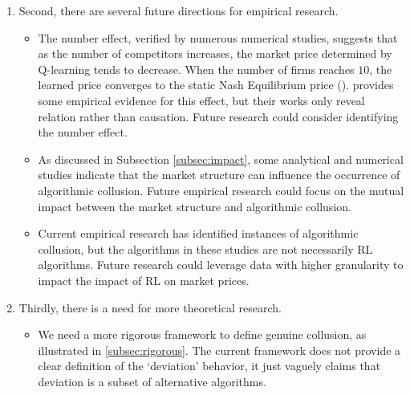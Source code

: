 \documentclass[mnsc,nonblindrev]{workingpaper}
\begin{document}
\begin{enumerate}
\begin{itemize}
            \item Another direction for numerical research is inspired by \cite{spann2024algorithmic}. Beyond algorithmic collusion, can AI pricing algorithms lead to unfair pricing and facilitate automatic price discrimination in other market environments? This is a question that deserves further exploration. 

            \item Furthur research could investigate whether AI algorithms would lead to algorithmic collusion in other disciplines, such as the financial markets (\cite{contDynamicsMarketMaking2024}, \cite{dou2024ai}), auction games (\cite{banchio2022artificial}, \cite{banchioartificial}), assortment optimization (\cite{aouad2021algorithmic}), airline revenue management (\cite{gu2023can}).
        \end{itemize}

    \item Second, there are several future directions for empirical research.
        \begin{itemize}
        \setlength{\itemsep}{0.7em}
            \item The number effect, verified by numerous numerical studies, suggests that as the number of competitors increases, the market price determined by Q-learning tends to decrease. When the number of firms reaches $10$, the learned price converges to the static Nash Equilibrium price (\cite{hettich2021algorithmic}). \cite{wieting2021algorithms} provides some empirical evidence for this effect, but their works only reveal relation rather than causation. Future research could consider identifying the number effect.
            \item As discussed in Subsection \ref{subsec:impact}, some analytical and numerical studies indicate that the market structure can influence the occurrence of algorithmic collusion. Future empirical research could focus on the mutual impact between the market structure and algorithmic collusion.
            \item Current empirical research has identified instances of algorithmic collusion, but the algorithms in these studies are not necessarily RL algorithms. Future research could leverage data with higher granularity to impact the impact of RL on market prices.
        \end{itemize}

    \item Thirdly, there is a need for more theoretical research.
        \begin{itemize}
        \setlength{\itemsep}{0.7em}
            \item We need a more rigorous framework to define genuine collusion, as illustrated in \ref{subsec:rigorous}. The current framework does not provide a clear definition of the `deviation' behavior, it just vaguely claims that deviation is a subset of alternative algorithms.  
            

\end{itemize}
\end{enumerate}
\end{document}
